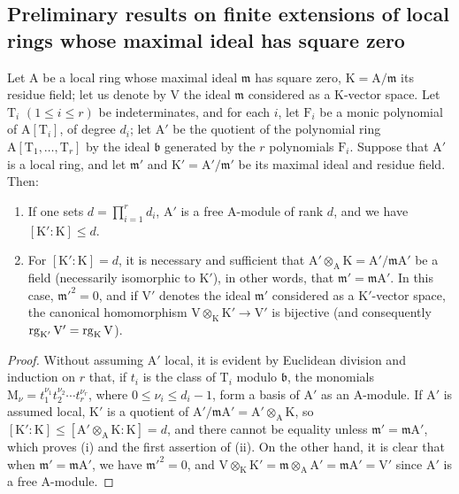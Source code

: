 \subsection{Preliminary results on finite extensions of local rings whose maximal ideal has square zero}
\label{subsection:0.22.4}
\label{0.22.4}

\begin{proposition}[22.4.1]
\label{0.22.4.1}
Let $\mathrm{A}$ be a local ring whose maximal ideal $\mathfrak{m}$ has square zero, $\mathrm{K}=\mathrm{A}/\mathfrak{m}$ its residue field; let us denote by $\mathrm{V}$ the ideal $\mathfrak{m}$ considered as a $\mathrm{K}$-vector space.
Let $\mathrm{T}_i$ $(1\leq i\leq r)$ be indeterminates, and for each $i$, let $\mathrm{F}_i$ be a monic polynomial of $\mathrm{A}[\mathrm{T}_i]$, of degree $d_i$; let $\mathrm{A}'$ be the quotient of the polynomial ring $\mathrm{A}[\mathrm{T}_1,\ldots,\mathrm{T}_r]$ by the ideal $\mathfrak{b}$ generated by the $r$ polynomials $\mathrm{F}_i$.
Suppose that $\mathrm{A}'$ is a local ring, and let $\mathfrak{m}'$ and $\mathrm{K}'=\mathrm{A}'/\mathfrak{m}'$ be its maximal ideal and residue field.
Then:
\begin{enumerate}
  \item[\rm{(i)}] If one sets $d=\prod_{i=1}^r d_i$, $\mathrm{A}'$ is a free $\mathrm{A}$-module of rank $d$, and we have $[\mathrm{K}':\mathrm{K}]\leq d$.
  \item[\rm{(ii)}] For $[\mathrm{K}':\mathrm{K}]=d$, it is necessary and sufficient that $\mathrm{A}'\otimes_\mathrm{A}\mathrm{K}=\mathrm{A}'/\mathfrak{m}\mathrm{A}'$ be a field (necessarily isomorphic to $\mathrm{K}'$), in other words, that $\mathfrak{m}'=\mathfrak{m}\mathrm{A}'$.
  In this case, $\mathfrak{m}'^2=0$, and if $\mathrm{V}'$ denotes the ideal $\mathfrak{m}'$ considered as a $\mathrm{K}'$-vector space, the canonical homomorphism $\mathrm{V}\otimes_\mathrm{K}\mathrm{K}'\to\mathrm{V}'$ is bijective (and consequently $\operatorname{rg}_{\mathrm{K}'}\mathrm{V}'=\operatorname{rg}_\mathrm{K}\mathrm{V}$).
\end{enumerate}
\end{proposition}

\begin{proof}
Without assuming $\mathrm{A}'$ local, it is evident by Euclidean division and induction on $r$ that, if $t_i$ is the class of $\mathrm{T}_i$ modulo $\mathfrak{b}$, the monomials $\mathrm{M}_\nu=t_1^{\nu_1}t_2^{\nu_2}\cdots t_r^{\nu_r}$, where $0\leq\nu_i\leq d_i-1$, form a basis of $\mathrm{A}'$ as an $\mathrm{A}$-module.
If $\mathrm{A}'$ is assumed local, $\mathrm{K}'$ is a quotient of $\mathrm{A}'/\mathfrak{m}\mathrm{A}'=\mathrm{A}'\otimes_\mathrm{A}\mathrm{K}$, so $[\mathrm{K}':\mathrm{K}]\leq[\mathrm{A}'\otimes_\mathrm{A}\mathrm{K}:\mathrm{K}]=d$, and there cannot be equality unless $\mathfrak{m}'=\mathfrak{m}\mathrm{A}'$, which proves (i) and the first assertion of (ii).
On the other hand, it is clear that when $\mathfrak{m}'=\mathfrak{m}\mathrm{A}'$, we have $\mathfrak{m}'^2=0$, and $\mathrm{V}\otimes_\mathrm{K}\mathrm{K}'=\mathfrak{m}\otimes_\mathrm{A}\mathrm{A}'=\mathfrak{m}\mathrm{A}'=\mathrm{V}'$ since $\mathrm{A}'$ is a free $\mathrm{A}$-module.
\end{proof}

